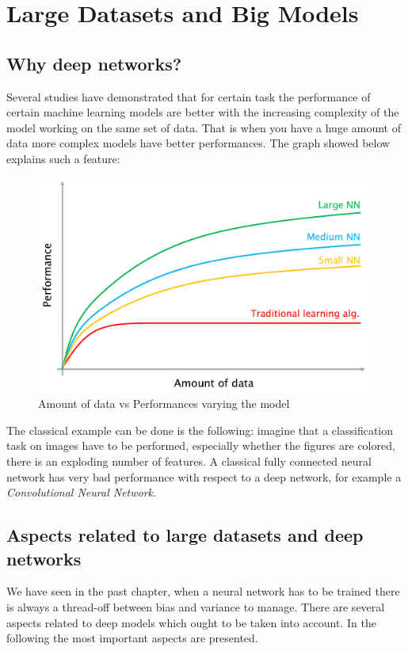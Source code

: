 \chapter[Large Datasets and Big models]{Large Datasets and Big Models}

\section{Why deep networks?}
Several studies have demonstrated that for certain task the performance of certain machine learning models are better with the increasing complexity of the model working on the same set of data. That is when you have a huge amount of data more complex models have better performances. 
The graph showed below explains such a feature:
\begin{figure}[h]
    \centering
    \includegraphics[scale=0.4]{img/perf.png}
    \caption{Amount of data vs Performances varying the model}
\end{figure}
The classical example can be done is the following: imagine that a classification task on images have to be performed, especially whether the figures are colored, there is an exploding number of features. A classical fully connected neural network has very bad performance with respect to a deep network, for example a \textit{Convolutional Neural Network}.

\section{Aspects related to large datasets and deep networks}
We have seen in the past chapter, when a neural network has to be trained there is always a thread-off between bias and variance to manage. There are several aspects related to deep models which ought to be taken into account. In the following the most important aspects are presented.

